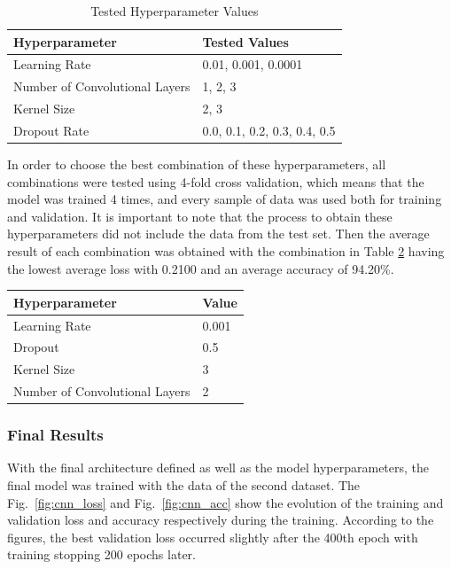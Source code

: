 \begin{table}[H]
\caption{Tested Hyperparameter Values}
\label{table:cnn_hyperparameters}
\centering
\begin{tabular}{|l|l|}
\hline
Hyperparameter & Tested Values \\
\hline
Learning Rate & 0.01, 0.001, 0.0001 \\
\hline
Number of Convolutional Layers & 1, 2, 3 \\
\hline
Kernel Size & 2, 3 \\
\hline
Dropout Rate & 0.0, 0.1, 0.2, 0.3, 0.4, 0.5 \\
\hline
\end{tabular}
\end{table}

In order to choose the best combination of these hyperparameters, all combinations were tested using 4-fold cross validation, which means that the model was trained 4 times, and every sample of data was used both for training and validation. It is important to note that the process to obtain these hyperparameters did not include the data from the test set. Then the average result of each combination was obtained with the combination in Table \ref{table:cnn_best_hyperparameters} having the lowest average loss with 0.2100 and an average accuracy of 94.20\%.

\begin{table}[H]
\label{table:cnn_best_hyperparameters}
\centering
\begin{tabular}{|l|l|}
\hline
Hyperparameter & Value \\
\hline
Learning Rate & 0.001 \\
\hline
Dropout & 0.5 \\
\hline
Kernel Size & 3 \\
\hline
Number of Convolutional Layers & 2 \\
\hline
\end{tabular}
\end{table}

\subsubsection{Final Results}

With the final architecture defined as well as the model hyperparameters, the final model was trained with the data of the second dataset. The Fig.~\ref{fig:cnn_loss} and Fig.~\ref{fig:cnn_acc} show the evolution of the training and validation loss and accuracy respectively during the training. According to the figures, the best validation loss occurred slightly after the 400th epoch with training stopping 200 epochs later.

